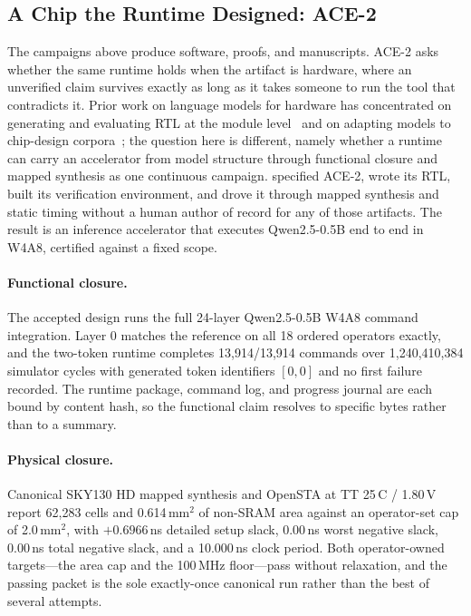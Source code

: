 \subsection{A Chip the Runtime Designed: ACE-2}
\label{sec:silicon-vertical}

The campaigns above produce software, proofs, and manuscripts. ACE-2 asks whether
the same runtime holds when the artifact is hardware, where an unverified claim
survives exactly as long as it takes someone to run the tool that contradicts it.
Prior work on language models for hardware has concentrated on generating and
evaluating RTL at the module level~\citep{liu2023verilogeval} and on adapting models
to chip-design corpora~\citep{liu2023chipnemo}; the question here is different,
namely whether a runtime can carry an accelerator from model structure through
functional closure and mapped synthesis as one continuous campaign.
\systemname specified ACE-2, wrote its RTL, built its verification environment,
and drove it through mapped synthesis and static timing without a human author of
record for any of those artifacts. The result is an inference accelerator that
executes Qwen2.5-0.5B end to end in W4A8, certified against a fixed scope.

\paragraph{Functional closure.} The accepted design runs the full 24-layer
Qwen2.5-0.5B W4A8 command integration. Layer 0 matches the reference on all 18
ordered operators exactly, and the two-token runtime completes
13{,}914/13{,}914 commands over 1{,}240{,}410{,}384 simulator cycles with
generated token identifiers $[0,0]$ and no first failure recorded. The runtime
package, command log, and progress journal are each bound by content hash, so the
functional claim resolves to specific bytes rather than to a summary.

\paragraph{Physical closure.} Canonical SKY130 HD mapped synthesis and OpenSTA at
TT 25\,\textdegree C / 1.80\,V report 62{,}283 cells and 0.614\,mm$^2$ of
non-SRAM area against an operator-set cap of 2.0\,mm$^2$, with $+0.6966$\,ns
detailed setup slack, 0.00\,ns worst negative slack, 0.00\,ns total negative
slack, and a 10.000\,ns clock period. Both operator-owned targets---the area cap
and the 100\,MHz floor---pass without relaxation, and the passing packet is the
sole exactly-once canonical run rather than the best of several attempts.

